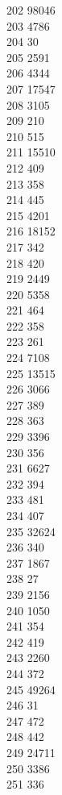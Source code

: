 { 202	98046 \\
 203	4786 \\
 204	30 \\
 205	2591 \\
 206	4344 \\
 207	17547 \\
 208	3105 \\
 209	210 \\
 210	515 \\
 211	15510 \\
 212	409 \\
 213	358 \\
 214	445 \\
 215	4201 \\
 216	18152 \\
 217	342 \\
 218	420 \\
 219	2449 \\
 220	5358 \\
 221	464 \\
 222	358 \\
 223	261 \\
 224	7108 \\
 225	13515 \\
 226	3066 \\
 227	389 \\
 228	363 \\
 229	3396 \\
 230	356 \\
 231	6627 \\
 232	394 \\
 233	481 \\
 234	407 \\
 235	32624 \\
 236	340 \\
 237	1867 \\
 238	27 \\
 239	2156 \\
 240	1050 \\
 241	354 \\
 242	419 \\
 243	2260 \\
 244	372 \\
 245	49264 \\
 246	31 \\
 247	472 \\
 248	442 \\
 249	24711 \\
 250	3386 \\
 251	336 \\
}
